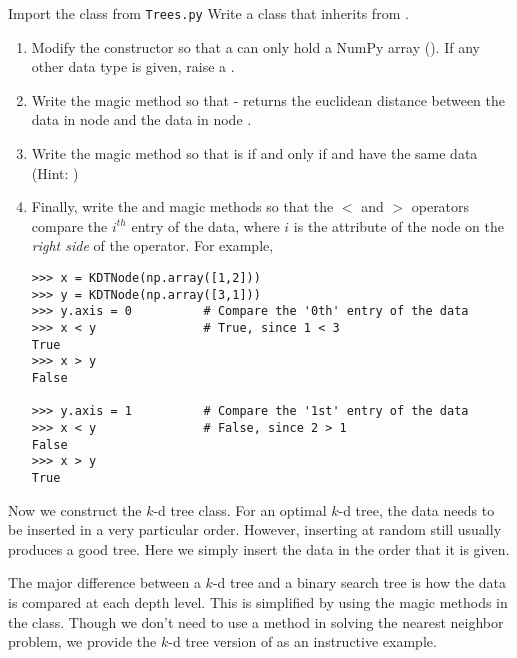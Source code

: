 \begin{problem}
Import the  class from \texttt{Trees.py}%
Write a  class that inherits from .
\begin{enumerate}
\item Modify the constructor so that a  can only hold a NumPy array ().
If any other data type is given, raise a .
\item Write the  magic method so that  -  returns the euclidean distance between the data in node  and the data in node .

\item Write the  magic method so that  is  if and only if  and  have the same data (Hint: )

\item Finally, write the  and  magic methods so that the $<$ and $>$ operators compare the $i^{th}$ entry of the data, where $i$ is the  attribute of the node on the \emph{right side} of the operator.
For example,

\begin{lstlisting}
>>> x = KDTNode(np.array([1,2]))
>>> y = KDTNode(np.array([3,1]))
>>> y.axis = 0			# Compare the '0th' entry of the data 
>>> x < y				# True, since 1 < 3
True
>>> x > y
False

>>> y.axis = 1			# Compare the '1st' entry of the data
>>> x < y				# False, since 2 > 1
False
>>> x > y
True
\end{lstlisting}
\end{enumerate}
\end{problem}

Now we construct the $k$-d tree class.
For an optimal $k$-d tree, the data needs to be inserted in a very particular order.
However, inserting at random still usually produces a good tree.
Here we simply insert the data in the order that it is given.

The major difference between a $k$-d tree and a binary search tree is how the data is compared at each depth level.
This is simplified by using the magic methods in the  class.
Though we don't need to use a  method in solving the nearest neighbor problem, we provide the $k$-d tree version of  as an instructive example.

